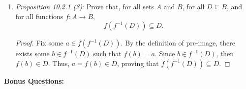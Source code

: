 \documentclass{article}
\begin{document}
\begin{enumerate}
	\item \emph{Proposition 10.2.1 (8)}: Prove that, for all sets $A$ and $B$, for all $D \subseteq B$, and for all functions $f : A \rightarrow B$,
		\[
			f(f^{\minus1}(D)) \subseteq D.
		\]
            \begin{proof}
                Fix some $a\in f(f^{\minus1}(D))$. By the definition of pre-image, there exists some $b\in f^{\minus1}(D)$ such that $f(b) = a$. Since $b\in f^{\minus1}(D)$,
                then $f(b)\in D$. Thus, $a = f(b)\in D$, proving that $f(f^{\minus1}(D)) \subseteq D$.
            \end{proof}
    \end{enumerate}

\newpage
\textbf{Bonus Questions:}

\begin{itemize}


\end{itemize}
\end{document}
